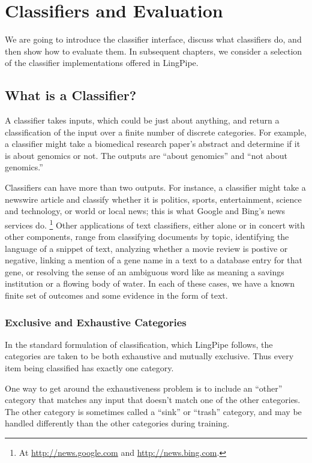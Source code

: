 \chapter{Classifiers and Evaluation}\label{chap:classifier-evaluation}

We are going to introduce the classifier interface, discuss what
classifiers do, and then show how to evaluate them.  In subsequent
chapters, we consider a selection of the classifier implementations
offered in LingPipe.

\section{What is a Classifier?}

A classifier takes inputs, which could be just about anything, and
return a classification of the input over a finite number of discrete
categories.  For example, a classifier might take a biomedical
research paper's abstract and determine if it is about genomics or
not.  The outputs are ``about genomics'' and ``not about genomics.''

Classifiers can have more than two outputs.  For instance, a
classifier might take a newswire article and classify whether it is
politics, sports, entertainment, science and technology, or world or
local news; this is what Google and Bing's news services do.%
%
\footnote{At \url{http://news.google.com} and
  \url{http://news.bing.com}.}
%
Other applications of text classifiers, either alone or in concert
with other components, range from classifying documents by topic,
identifying the language of a snippet of text, analyzing whether a
movie review is postive or negative, linking a mention of a gene name
in a text to a database entry for that gene, or resolving the sense of
an ambiguous word like  as meaning a savings
institution or a flowing body of water.  In each of these cases, we
have a known finite set of outcomes and some evidence in the form of
text.

\subsection{Exclusive and Exhaustive Categories}

In the standard formulation of classification, which LingPipe follows,
the categories are taken to be both exhaustive and mutually exclusive.
Thus every item being classified has exactly one category.

One way to get around the exhaustiveness problem is to include an
``other'' category that matches any input that doesn't match one of
the other categories.  The other category is sometimes called a
``sink'' or ``trash'' category, and may be handled differently than
the other categories during training.

